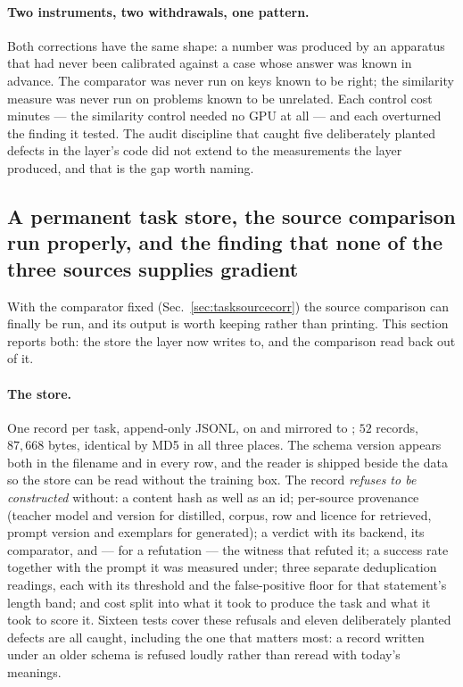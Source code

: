\paragraph{Two instruments, two withdrawals, one pattern.} Both corrections have the same
shape: a number was produced by an apparatus that had never been calibrated against a case
whose answer was known in advance. The comparator was never run on keys known to be right; the
similarity measure was never run on problems known to be unrelated. Each control cost minutes
--- the similarity control needed no GPU at all --- and each overturned the finding it tested.
The audit discipline that caught five deliberately planted defects in the layer's code did not
extend to the measurements the layer produced, and that is the gap worth naming.

\subsection{A permanent task store, the source comparison run properly, and the finding that
none of the three sources supplies gradient}
\label{sec:taskstore}

With the comparator fixed (Sec.~\ref{sec:tasksourcecorr}) the source comparison can finally be
run, and its output is worth keeping rather than printing. This section reports both: the store
the layer now writes to, and the comparison read back out of it.

\paragraph{The store.} One record per task, append-only JSONL, on
 and mirrored to
; $52$ records, $87{,}668$ bytes, identical by MD5 in all three
places. The schema version appears both in the filename and in every row, and the reader is
shipped beside the data so the store can be read without the training box. The record
\emph{refuses to be constructed} without: a content hash as well as an id; per-source
provenance (teacher model and version for distilled, corpus, row and licence for retrieved,
prompt version and exemplars for generated); a verdict with its backend, its comparator, and
--- for a refutation --- the witness that refuted it; a success rate together with the prompt
it was measured under; three separate deduplication readings, each with its threshold and the
false-positive floor for that statement's length band; and cost split into what it took to
produce the task and what it took to score it. Sixteen tests cover these refusals and eleven
deliberately planted defects are all caught, including the one that matters most: a record
written under an older schema is refused loudly rather than reread with today's meanings.

